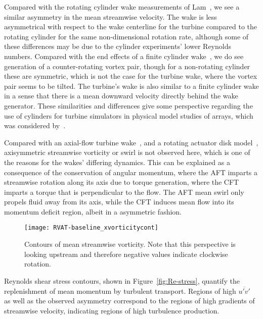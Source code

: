 Compared with the rotating cylinder wake measurements of Lam~\cite{Lam2009}, we
see a similar asymmetry in the mean streamwise velocity. The wake is less
asymmetrical with respect to the wake centerline for the turbine compared to the
rotating cylinder for the same non-dimensional rotation rate, although some of
these differences may be due to the cylinder experiments' lower Reynolds
numbers. Compared with the end effects of a finite cylinder
wake~\cite{Sumner2004}, we do see generation of a counter-rotating vortex pair,
though for a non-rotating cylinder these are symmetric, which is not the case
for the turbine wake, where the vortex pair seems to be tilted. The turbine's
wake is also similar to a finite cylinder wake in a sense that there is a mean
downward velocity directly behind the wake generator. These similarities and
differences give some perspective regarding the use of cylinders for turbine
simulators in physical model studies of arrays, which was considered
by~\cite{Pierce2013}.

Compared with an axial-flow turbine wake~\cite{Cal2010}, and a rotating actuator
disk model~\cite{Wu2011}, axisymmetric streamwise vorticity or swirl is not
observed here, which is one of the reasons for the wakes' differing dynamics.
This can be explained as a consequence of the conservation of angular momentum,
where the AFT imparts a streamwise rotation along its axis due to torque
generation, where the CFT imparts a torque that is perpendicular to the flow.
The AFT mean swirl only propels fluid away from its axis, while the CFT induces
mean flow into its momentum deficit region, albeit in a asymmetric fashion.

\begin{figure}
    \centering

    \texttt{[image: RVAT-baseline\_xvorticitycont]}

    \caption{Contours of mean streamwise vorticity. Note that this perspective
        is looking upstream and therefore negative values indicate clockwise
        rotation.}

    \label{fig:RVAT-baseline-xvorticity}
\end{figure}

Reynolds shear stress contours, shown in Figure~\ref{fig:Re-stress}, quantify the
replenishment of mean momentum by turbulent transport. Regions of high
$\overline{u'v'}$ as well as the observed asymmetry correspond to the regions of
high gradients of streamwise velocity, indicating regions of high turbulence
production.


